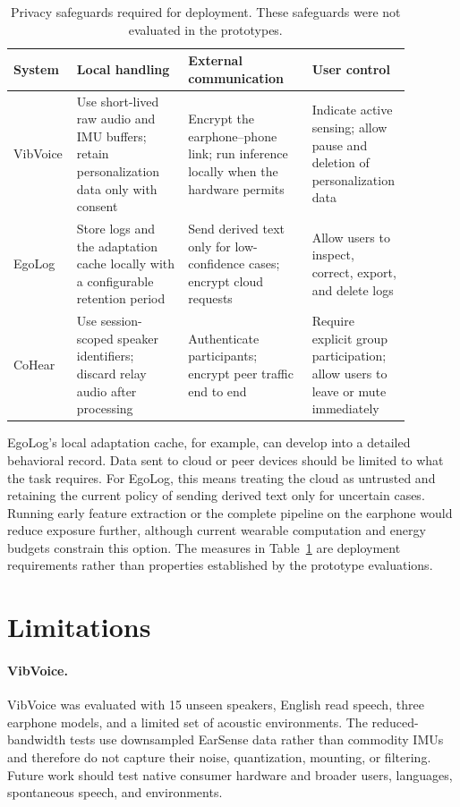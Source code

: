 \documentclass[11pt]{gsasthesis} %
\begin{document}
\begin{table}[htbp]
\centering
\small
\caption{Privacy safeguards required for deployment. These safeguards were not evaluated in the prototypes.}
\label{tab:privacy_safeguards}
\begin{tabular}{p{0.11\linewidth}p{0.27\linewidth}p{0.30\linewidth}p{0.20\linewidth}}
\toprule
\textbf{System} & \textbf{Local handling} & \textbf{External communication} & \textbf{User control} \\
\midrule
VibVoice & Use short-lived raw audio and IMU buffers; retain personalization data only with consent & Encrypt the earphone--phone link; run inference locally when the hardware permits & Indicate active sensing; allow pause and deletion of personalization data \\
EgoLog & Store logs and the adaptation cache locally with a configurable retention period & Send derived text only for low-confidence cases; encrypt cloud requests & Allow users to inspect, correct, export, and delete logs \\
CoHear & Use session-scoped speaker identifiers; discard relay audio after processing & Authenticate participants; encrypt peer traffic end to end & Require explicit group participation; allow users to leave or mute immediately \\
\bottomrule
\end{tabular}
\end{table}

EgoLog's local adaptation cache, for example, can develop into a detailed behavioral record. Data sent to cloud or peer devices should be limited to what the task requires. For EgoLog, this means treating the cloud as untrusted and retaining the current policy of sending derived text only for uncertain cases. Running early feature extraction or the complete pipeline on the earphone would reduce exposure further, although current wearable computation and energy budgets constrain this option. The measures in Table~\ref{tab:privacy_safeguards} are deployment requirements rather than properties established by the prototype evaluations.

\section{Limitations}
\label{sec:thesis_limitations}

\paragraph{VibVoice.}
VibVoice was evaluated with 15 unseen speakers, English read speech, three earphone models, and a limited set of acoustic environments. The reduced-bandwidth tests use downsampled EarSense data rather than commodity IMUs and therefore do not capture their noise, quantization, mounting, or filtering. Future work should test native consumer hardware and broader users, languages, spontaneous speech, and environments.
\end{document}
